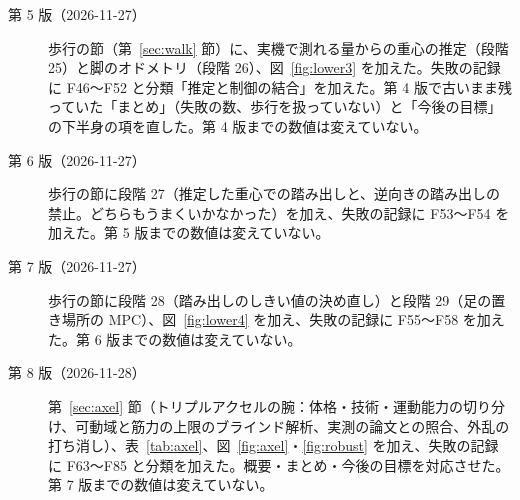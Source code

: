 \documentclass[paper=a4paper,fontsize=10pt,twocolumn,column_gap=2zw,line_length=24zw,number_of_lines=46,head_space=20mm]{jlreq}
\begin{document}
\begin{description}
\item[第 5 版（2026-11-27）] 歩行の節（第~\ref{sec:walk} 節）に、実機で測れる量からの重心の推定（段階 25）と脚のオドメトリ（段階 26）、図~\ref{fig:lower3} を加えた。失敗の記録に F46〜F52 と分類「推定と制御の結合」を加えた。第 4 版で古いまま残っていた「まとめ」（失敗の数、歩行を扱っていない）と「今後の目標」の下半身の項を直した。第 4 版までの数値は変えていない。
\item[第 6 版（2026-11-27）] 歩行の節に段階 27（推定した重心での踏み出しと、逆向きの踏み出しの禁止。どちらもうまくいかなかった）を加え、失敗の記録に F53〜F54 を加えた。第 5 版までの数値は変えていない。
\item[第 7 版（2026-11-27）] 歩行の節に段階 28（踏み出しのしきい値の決め直し）と段階 29（足の置き場所の MPC）、図~\ref{fig:lower4} を加え、失敗の記録に F55〜F58 を加えた。第 6 版までの数値は変えていない。
\item[第 8 版（2026-11-28）] 第~\ref{sec:axel} 節（トリプルアクセルの腕：体格・技術・運動能力の切り分け、可動域と筋力の上限のブラインド解析、実測の論文との照合、外乱の打ち消し）、表~\ref{tab:axel}、図~\ref{fig:axel}・\ref{fig:robust} を加え、失敗の記録に F63〜F85 と分類を加えた。概要・まとめ・今後の目標を対応させた。第 7 版までの数値は変えていない。
\end{description}
\end{document}
